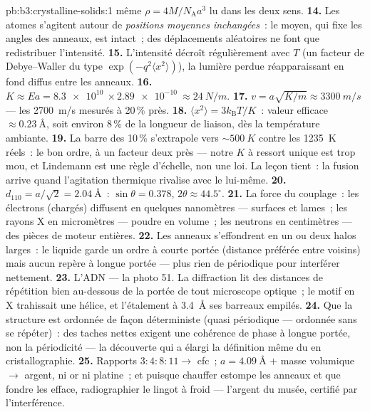 \begin{solution}{pb:b3:crystalline-solids:1}
même $\rho = 4M/N_{\text{A}}a^3$ lu dans les deux sens.
\textbf{14.} Les atomes s'agitent autour de \emph{positions
moyennes inchangées}~: le  moyen, qui fixe les angles des
anneaux, est intact~; des déplacements aléatoires ne font que
redistribuer l'intensité.
\textbf{15.} L'intensité décroît régulièrement avec $T$ (un facteur
de Debye--Waller du type $\exp(-q^2\langle x^2\rangle)$), la lumière
perdue réapparaissant en fond diffus entre les anneaux.
\textbf{16.} $K \approx Ea = \qty{8.3e10}{}\times
\qty{2.89e-10}{} \approx \qty{24}{N/m}$.
\textbf{17.} $v = a\sqrt{K/m} \approx \qty{3300}{m/s}$ ---
les \qty{2700}{m/s} mesurés à 20\,\% près.
\textbf{18.} $\langle x^2\rangle = 3k_{\text{B}}T/K$~: valeur
efficace $\approx\qty{0.23}{\angstrom}$, soit environ 8\,\% de la
longueur de liaison, dès la température ambiante.
\textbf{19.} La barre des 10\,\% s'extrapole vers
$\sim\qty{500}{K}$ contre les \qty{1235}{K} réels~: le bon ordre, à
un facteur deux près --- notre $K$ à ressort unique est trop mou, et
Lindemann est une règle d'échelle, non une loi. La leçon tient~: la
fusion arrive quand l'agitation thermique rivalise avec le 
lui-même.
\textbf{20.} $d_{110} = a/\sqrt2 = \qty{2.04}{\angstrom}$~:
$\sin\theta = 0.378$, $2\theta \approx 44.5^\circ$.
\textbf{21.} La force du couplage~: les électrons (chargés)
diffusent en quelques nanomètres --- surfaces et lames~; les rayons
X en micromètres --- poudre en volume~; les neutrons en centimètres
--- des pièces de moteur entières.
\textbf{22.} Les anneaux s'effondrent en un ou deux halos larges~:
le liquide garde un ordre à courte portée (distance préférée entre
voisins) mais aucun repère à longue portée --- plus rien de
périodique pour interférer nettement.
\textbf{23.} L'ADN --- la photo 51. La diffraction lit des
distances de répétition bien au-dessous de la portée de tout
microscope optique~; le motif en X trahissait une hélice, et
l'étalement à \qty{3.4}{\angstrom} ses barreaux empilés.
\textbf{24.} Que la structure est ordonnée de façon déterministe
(quasi périodique --- ordonnée sans se répéter)~: des taches nettes
exigent une cohérence de phase à longue portée, non la périodicité
--- la découverte qui a élargi la définition même du  en
cristallographie.
\textbf{25.} Rapports $3:4:8:11 \to$ cfc~; $a = \qty{4.09}{\angstrom}$
$+$ masse volumique $\to$ argent, ni or ni platine~; et puisque
chauffer estompe les anneaux et que fondre les efface, radiographier
le lingot à froid --- l'argent du musée, certifié par
l'interférence.
\end{solution}
